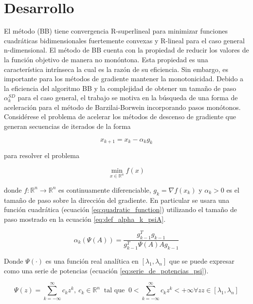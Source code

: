 
\section*{Desarrollo}

El método (BB) tiene convergencia R-superlineal para minimizar funciones cuadráticas bidimensionales fuertemente convexas y R-lineal para el caso general n-dimensional\cite{Fletcher_2005}. El método de BB cuenta con la propiedad de reducir los valores de la función objetivo de manera no monóntona. Esta propiedad es una característica intrínseca la cual es la razón de su eficiencia. Sin embargo, es importante para los métodos de gradiente mantener la monotonicidad. Debido a la eficiencia del algoritmo BB y la complejidad de obtener un tamaño de paso $\alpha_k^{SD}$ para el caso general, el trabajo se motiva en la búsqueda de una forma de aceleración para el método de Barzilai-Borwein incorporando pasos monótonos. Considérese el problema de acelerar los métodos de descenso de gradiente que generan secuencias de iterados de la forma

\begin{equation*}
    x_{k+1} = x_k - \alpha_k g_k
\end{equation*}

para resolver el problema

\begin{equation}
    \min_{x\in\mathbb{R}^n}f(x)
\end{equation}

donde $f:\mathbb{R}^n \rightarrow \mathbb{R}^n$ es continuamente diferenciable, $g_k=\nabla f(x_k)$ y $\alpha_k>0$ es el tamaño de paso sobre la dirección del gradiente. En particular se usara una función cuadrática (ecuación \ref{eq:quadratic_function}) utilizando el tamaño de paso mostrado en la ecuación \ref{eq:def_alpha_k_psiA}.

\begin{equation}
    \alpha_k(\Psi(A)) = \frac{g_{k-1}^Tg_{k-1}}{g^T_{k-1}\Psi(A)Ag_{k-1}} \label{eq:def_alpha_k_psiA}
\end{equation}

Donde $\Psi(\cdot)$ es una función real analítica en $[\lambda_1, \lambda_n]$ que se puede expresar como una serie de potencias (ecuación \ref{eq:serie_de_potencias_psi}).

\begin{equation}
    \Psi(z) = \sum\limits_{k=-\infty}^{\infty} c_kz^k,\ c_k\in \mathbb{R}^n  \;\; \text{tal que} \;\; 0<\sum_{k =- \infty}^{\infty}c_k z^k<+\infty \forall z z\in[\lambda_1,  \lambda_n]  \label{eq:serie_de_potencias_psi}
\end{equation}

